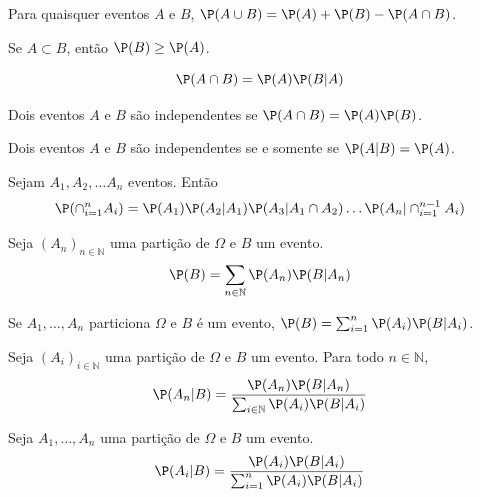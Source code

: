 \begin{lemma}
 \label{union_prob}
 Para quaisquer eventos $A$ e $B$, 
 $\P(A \cup B) = \P(A) + \P(B) - \P(A \cap B)$.
\end{lemma}

\begin{lemma}
 \label{lemma:monotProb}
 Se $A \subset B$, então $\P(B) \geq \P(A)$.
\end{lemma}

\begin{definition}
 \label{conditional_probability}
 \[ \P(A \cap B) = \P(A)\P(B|A) \]
\end{definition}

\begin{definition}
 \label{independence}
 Dois eventos $A$ e $B$ são independentes se $\P(A \cap B) = \P(A)\P(B)$.
\end{definition}

\begin{lemma}
 Dois eventos $A$ e $B$ são independentes se e somente se $\P(A|B) = \P(A)$.
\end{lemma}

\begin{theorem}
 \label{thm::mult}
 Sejam $A_{1}, A_{2}, \ldots A_{n}$ eventos. Então
 $$\P(\cap_{i=1}^n{A_{i}}) = \P(A_{1})\P(A_{2}|A_{1})\P(A_{3}|A_{1}\cap A_2) \ldots \P(A_{n}|\cap_{i=1}^{n-1} A_{i})$$
\end{theorem}

\begin{theorem}
 \label{ltp}
 Seja $(A_{n})_{n \in \mathbb{N}}$ uma partição de $\Omega$ e $B$ um evento. 
 \[ \P(B) = \sum_{n \in \mathbb{N}}{\P(A_{n})\P(B|A_{n})} \]
\end{theorem}

\begin{lemma}
 \label{finite_ltp}
 Se $A_{1},\ldots,A_{n}$ particiona $\Omega$ e $B$ é um evento, $\P(B) = \sum_{i = 1}^{n}{\P(A_{i})\P(B|A_{i})}$.
\end{lemma}

\begin{theorem}
 \label{bayes}
 Seja $(A_{i})_{i \in \mathbb{N}}$ uma partição de $\Omega$ e $B$ um evento. 
 Para todo $n \in \mathbb{N}$,
 \[ \P(A_{n}|B) = \frac{\P(A_{n})\P(B|A_{n})}{\sum_{i \in \mathbb{N}}{\P(A_{i})\P(B|A_{i})}} \]
\end{theorem}

\begin{lemma}
 \label{finite_bayes}
 Seja $A_{1}, \ldots, A_{n}$ uma partição de $\Omega$ e $B$ um evento.
 \[ \P(A_{i}|B) = \frac{\P(A_{i})\P(B|A_{i})}{\sum_{i=1}^{n}{\P(A_{i})\P(B|A_{i})}} \]
\end{lemma}

